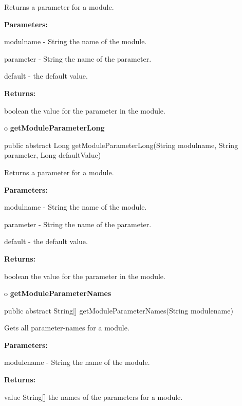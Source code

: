 \begin{description}
\htmlDD Returns a parameter for a module. 

\begin{description}
\item {\bf Parameters:}  

modulname - String the name of the module.  

parameter - String the name of the parameter.  

default - the default value.  
\item {\bf Returns:}  

boolean the value for the parameter in the module.  
\end{description}

\end{description}

o {\bf getModuleParameterLong} 

\begin{PRE}
 public abstract Long getModuleParameterLong(String modulname,
                                             String parameter,
                                             Long defaultValue)
\end{PRE}

\begin{description}
\htmlDD Returns a parameter for a module. 

\begin{description}
\item {\bf Parameters:}  

modulname - String the name of the module.  

parameter - String the name of the parameter.  

default - the default value.  
\item {\bf Returns:}  

boolean the value for the parameter in the module.  
\end{description}

\end{description}

o {\bf getModuleParameterNames} 

\begin{PRE}
 public abstract String[] getModuleParameterNames(String modulename)
\end{PRE}

\begin{description}
\htmlDD Gets all parameter-names for a module. 

\begin{description}
\item {\bf Parameters:}  

modulename - String the name of the module.  
\item {\bf Returns:}  

value String[] the names of the parameters for a module.  
\end{description}

\end{description}

